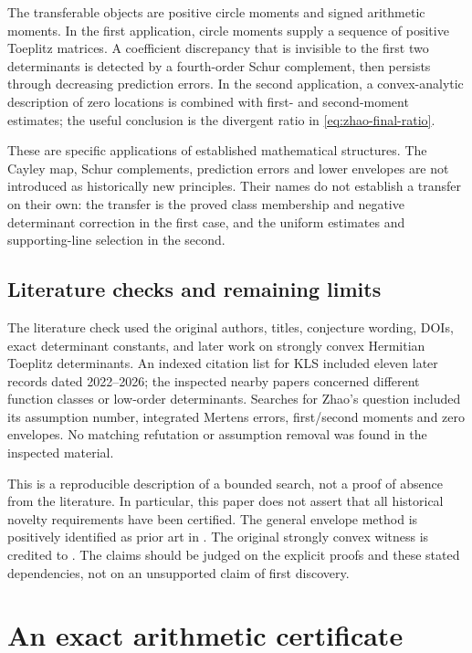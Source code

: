\documentclass[11pt,a4paper]{article}
\numberwithin{equation}{section}
\theoremstyle{definition}\newtheorem{definition}[theorem]{Definition}
\theoremstyle{remark}\newtheorem{remark}[theorem]{Remark}
\begin{document}
The transferable objects are positive circle moments and signed arithmetic
moments. In the first application, circle moments supply a sequence of
positive Toeplitz matrices. A coefficient discrepancy that is invisible
to the first two determinants is detected by a fourth-order Schur
complement, then persists through decreasing prediction errors. In the
second application, a convex-analytic description of zero locations is
combined with first- and second-moment estimates; the useful conclusion is
the divergent ratio in \eqref{eq:zhao-final-ratio}.

These are specific applications of established mathematical structures.
The Cayley map, Schur complements, prediction errors and lower envelopes
are not introduced as historically new principles. Their names do not
establish a transfer on their own: the transfer is the proved class
membership and negative determinant correction in the first case, and the
uniform estimates and supporting-line selection in the second.

\subsection{Literature checks and remaining limits}

The literature check used the original authors, titles, conjecture wording,
DOIs, exact determinant constants, and later work on strongly convex
Hermitian Toeplitz determinants. An indexed citation list for KLS included
eleven later records dated 2022--2026; the inspected nearby papers concerned
different function classes or low-order determinants. Searches for Zhao's
question included its assumption number, integrated Mertens errors,
first/second moments and zero envelopes. No matching refutation or
assumption removal was found in the inspected material.

This is a reproducible description of a bounded search, not a proof of
absence from the literature. In particular, this paper does not assert
that all historical novelty requirements have been certified. The general
envelope method is positively identified as prior art in
\cite{Pintz2017,Revesz2025,Broucke2026}. The original strongly convex
witness is credited to \cite{KLS2021}. The claims should be judged on the
explicit proofs and these stated dependencies, not on an unsupported
claim of first discovery.

\appendix
\section{An exact arithmetic certificate}
\label{app:certificate}
\end{document}
